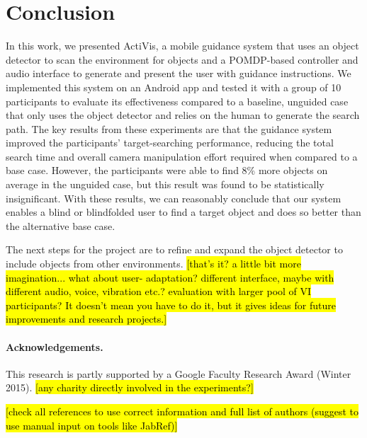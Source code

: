\documentclass[runningheads]{llncs}
\DeclareRobustCommand{\tofix}[1]{{\sethlcolor{yellow}\hl{[#1]}}}
\begin{document}

\section{Conclusion}\label{sec:conclusion}

In this work, we presented ActiVis, a mobile guidance system that uses an object detector to scan the environment for objects and a POMDP-based controller and audio interface to generate and present the user with guidance instructions. 
We implemented this system on an Android app and tested it with a group of 10 participants to evaluate its effectiveness compared to a baseline, unguided case that only uses the object detector and relies on the human to generate the search path. 
The key results from these experiments are that the guidance system improved the participants' target-searching performance, reducing the total search time and overall camera manipulation effort required when compared to a base case.
However, the participants were able to find 8\% more objects on average in the unguided case, but this result was found to be statistically insignificant. 
With these results, we can reasonably conclude that our system enables a blind or blindfolded user to find a target object and does so better than the alternative base case.

The next steps for the project are to refine and expand the object detector to include objects from other environments. \tofix{that's it? a little bit more imagination... what about user- adaptation? different interface, maybe with different audio, voice, vibration etc.? evaluation with larger pool of VI participants? It doesn't mean you have to do it, but it gives ideas for future improvements and research projects.}

\paragraph{{\bf Acknowledgements.}}\label{sec:acknowledge}
This research is partly supported by a Google Faculty Research Award (Winter 2015).
\tofix{any charity directly involved in the experiments?}

\tofix{check all references to use correct information and full list of authors (suggest to use manual input on tools like JabRef)}


\end{document}
